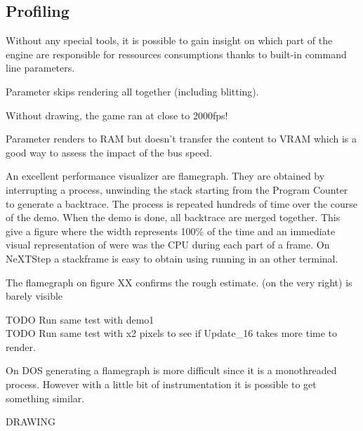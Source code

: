 \subsection{Profiling}
Without any special tools, it is possible to gain insight on which part of the engine are responsible for ressources consumptions thanks to built-in command line parameters.\\
\par
Parameter  skips rendering all together (including blitting).\\
\par
\par
{}
\par
Without drawing, the game ran at close to 2000fps!\\
\par
Parameter  renders to RAM but doesn't transfer the content to VRAM which is a good way to assess the impact of the bus speed.\\
\par
{}
\par
An excellent performance visualizer are flamegraph. They are obtained by interrupting a process, unwinding the stack starting from the Program Counter to generate a backtrace. The process is repeated hundreds of time over the course of the demo. When the demo is done, all backtrace are merged together. This give a figure where the width represents 100\% of the time and an immediate visual representation of were was the CPU during each part of a frame. On NeXTStep a stackframe is easy to obtain using  running in an other terminal.\\
\par
The flamegraph on figure XX confirms the rough estimate.  (on the very right) is barely visible \\
\par
TODO Run same test with demo1\\
TODO Run same test with x2 pixels to see if Update\_16 takes more time to render.\\

\par
On DOS generating a flamegraph is more difficult since it is a monothreaded process. However with a little bit of instrumentation it is possible to get something similar.\\
\par
DRAWING

